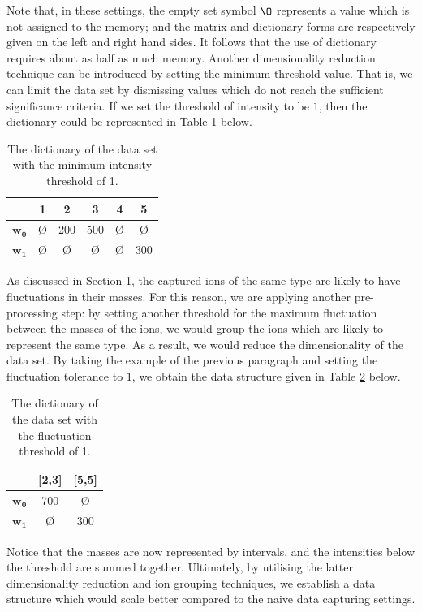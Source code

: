 \documentclass{mprop}
\begin{document}
Note that, in these settings, the empty set symbol $\O$ represents a value which is not assigned to the memory; and the matrix and dictionary forms are respectively given on the left and right hand sides. It follows that the use of dictionary requires about as half as much memory. Another dimensionality reduction technique can be introduced by setting the minimum threshold value. That is, we can limit the data set by dismissing values which do not reach the sufficient significance criteria. If we set the threshold of intensity to be $1$, then the dictionary could be represented in Table \ref{tab:d_threshhold} below.
\begin{table}[H]
\begin{center}
\begin{tabular}{|c||c|c|c|c|c|}
\hline
&1&2&3&4&5\\
\hline
$\mathbf{w_0}$&\O&200&500&\O&\O\\
$\mathbf{w_1}$&\O&\O&\O&\O&300\\
\hline
\end{tabular}
\end{center}
\caption{The dictionary of the data set with the minimum intensity threshold of 1.}
\label{tab:d_threshhold}
\end{table}

\par As discussed in Section 1, the captured ions of the same type are likely to have fluctuations in their masses. For this reason, we are applying another pre-processing step: by setting another threshold for the maximum fluctuation between the masses of the ions, we would group the ions which are likely to represent the same type. As a result, we would reduce the dimensionality of the data set. By taking the example of the previous paragraph and setting the fluctuation tolerance to $1$, we obtain the data structure given in Table \ref{tab:d_f_threshhold} below.
\begin{table}[H]
\begin{center}
\begin{tabular}{|c||c|c|}
\hline
&[2,3]&[5,5]\\
\hline
$\mathbf{w_0}$&700&\O\\
$\mathbf{w_1}$&\O&300\\
\hline
\end{tabular}
\end{center}
\caption{The dictionary of the data set with the fluctuation threshold of 1.}
\label{tab:d_f_threshhold}
\end{table}
Notice that the masses are now represented by intervals, and the intensities below the threshold are summed together. Ultimately, by utilising the latter dimensionality reduction and ion grouping techniques, we establish a data structure which would scale better compared to the naive data capturing settings.
\end{document}
